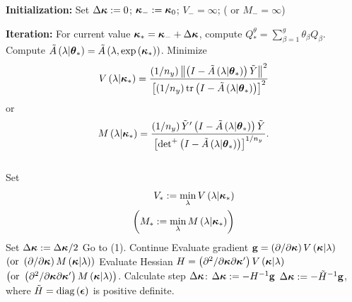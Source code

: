 \documentclass[12pt]{article}
\newcommand{\bfepsilon}{\mbox{\boldmath $\epsilon$}}
\newcommand{\bftheta}{\mbox{\boldmath $\theta$}}
\newcommand{\bfkappa}{\mbox{\boldmath $\kappa$}}
\newcommand{\tildeY}{\tilde{Y}}
\newcommand{\tildeA}{\tilde{A}}
\theoremstyle{definition}
\begin{document}
\begin{algorithm}[H]
\caption{ }
\begin{algorithmic}
\STATE \textbf{Initialization:} 
	\STATE Set $\Delta \bfkappa := 0$; \;$\bfkappa_{-}:=\bfkappa_{0}$; \;$V_- = \infty$; \;( or $M_- = \infty$)

\STATE \textbf{Iteration:} 
		\STATE For current value $\bfkappa_* = \bfkappa_- + \Delta \bfkappa$, compute $Q_*^\theta = \sum_{\beta = 1}^g \theta_\beta Q_\beta$. 
		\STATE Compute $\tildeA\left(\lambda \vert \bftheta_* \right) = \tildeA\left(\lambda, \exp\left({\bfkappa_*} \right)\right)$.
		\STATE Minimize \begin{equation*} V\left(\lambda \vert \bfkappa_* \right) = \frac{\left( 1/n_y \right)  \left \lVert \left(I - \tildeA\left(\lambda \vert \bftheta_* \right)\right) \tildeY \right\rVert^2}{\left[\left( 1/n_y \right) \textup{tr} \left(I - \tildeA\left(\lambda \vert \bftheta_* \right)\right)  \right]^2} \end{equation*} or  \begin{equation*} 
	M\left(\lambda \vert \bfkappa_* \right) = \frac{\left( 1/n_y \right) \tildeY' \left(I - \tildeA \left(\lambda \vert \bftheta_* \right)\right) \tildeY }{\left[ \mbox{det}^+\left(I - \tildeA\left(\lambda \vert \bftheta_* \right)\right)  \right]^{1/n_y}}.\end{equation*} \\
			Set 
			\begin{align*}
			V_* := \min \limits_\lambda V\left( \lambda \vert \bfkappa_* \right) \\
			\left( M_* := \min \limits_\lambda M\left(\lambda \vert \bfkappa_* \right) \right)
			\end{align*}
		 		\STATE Set $\Delta \bfkappa := \Delta \bfkappa/2$
		 		\STATE Go to (1).
		\ELSE
		\STATE Continue
		\ENDIF
		\STATE Evaluate gradient $\mathbf{g} = \left(\partial /\partial \bfkappa\right) V\left(\bfkappa \vert \lambda\right)$ $\left(\mbox{or }\left(\partial /\partial \bfkappa\right) M\left(\bfkappa \vert \lambda\right) \right)$
		\STATE Evaluate Hessian $H = \left(\partial^2 /\partial \bfkappa\partial \bfkappa' \right) V\left(\bfkappa \vert \lambda\right)$ $\left(\mbox{or } \left(\partial^2 /\partial \bfkappa\partial \bfkappa' \right) M\left(\bfkappa \vert \lambda \right) \right)$.
		\STATE Calculate step $\Delta \bfkappa$:
				\STATE $\Delta \bfkappa := -H^{-1} \mathbf{g}$
			\ELSE
				\STATE $\Delta \bfkappa := -\tilde{H}^{-1} \mathbf{g}$, where $\tilde{H} = \textup{diag}\left(\bfepsilon\right)$ is positive definite.

\end{algorithmic}
\end{algorithm}
\end{document}
